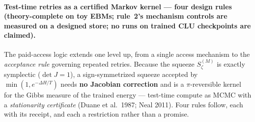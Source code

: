 \documentclass[11pt]{article}
\newcommand{\detJ}{\det J}
\begin{document}
\paragraph{Test-time retries as a certified Markov kernel --- four design rules (theory-complete on toy EBMs; rule~2's mechanism controls are measured on a designed store; no runs on trained CLU checkpoints are claimed).} The paid-access logic extends one level up, from a single access mechanism to the \emph{acceptance rule} governing repeated retries. Because the squeeze $S^{(M)}_\zeta$ is exactly symplectic ($\detJ=1$), a sign-symmetrized squeeze accepted by $\min(1,e^{-\Delta H/T})$ needs \textbf{no Jacobian correction} and is a $\pi$-reversible kernel for the Gibbs measure of the trained energy --- test-time compute as MCMC with a \emph{stationarity certificate} (Duane et al.\ 1987; Neal 2011). Four rules follow, each with its receipt, and each a restriction rather than a promise.
\end{document}
